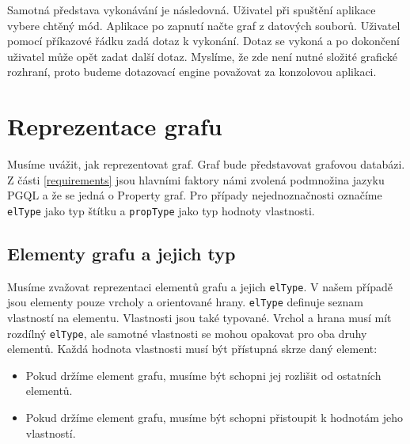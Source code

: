 Samotná představa vykonávání je následovná.
Uživatel při spuštění aplikace vybere chtěný mód.
Aplikace po zapnutí načte graf z datových souborů.
Uživatel pomocí příkazové řádku zadá dotaz k vykonání.
Dotaz se vykoná a po dokončení uživatel může opět zadat další dotaz.
Myslíme, že zde není nutné složité grafické rozhraní, proto budeme dotazovací engine považovat za konzolovou aplikaci. 

\section{Reprezentace grafu} \label{anal.grafrep}

Musíme uvážit, jak reprezentovat graf.
Graf bude představovat grafovou databázi.
Z části \ref{requirements} jsou hlavními faktory námi zvolená podmnožina jazyku PGQL a že se jedná o Property graf.
Pro případy nejednoznačnosti označíme \verb+elType+ jako typ štítku a \verb+propType+ jako typ hodnoty vlastnosti.

\subsection{Elementy grafu a jejich typ}

Musíme zvažovat reprezentaci elementů grafu a jejich \verb+elType+.
V našem případě jsou elementy pouze vrcholy a orientované hrany.
\verb+elType+ definuje seznam vlastností na elementu. 
Vlastnosti jsou také typované.
Vrchol a hrana musí mít rozdílný \verb+elType+, ale samotné vlastnosti se mohou opakovat pro oba druhy elementů.
Každá hodnota vlastnosti musí být přístupná skrze daný element:

\begin{itemize}

\item Pokud držíme element grafu, musíme být schopni jej rozlišit od ostatních elementů.

\item Pokud držíme element grafu, musíme být schopni přistoupit k hodnotám jeho vlastností.

\end{itemize}

